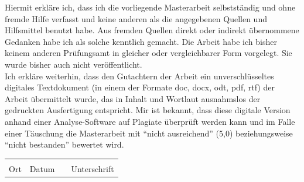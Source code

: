 \documentclass[oneside,12pt]{report}
\begin{document}
Hiermit erkläre ich, dass ich die vorliegende Masterarbeit selbstständig und ohne fremde Hilfe verfasst und keine anderen als die angegebenen Quellen und Hilfsmittel benutzt habe. Aus fremden Quellen direkt oder indirekt übernommene Gedanken habe ich als solche kenntlich gemacht. Die Arbeit habe ich bisher keinem anderen Prüfungsamt in gleicher oder vergleichbarer Form vorgelegt. Sie wurde bisher auch nicht veröffentlicht.\\[2cm]
Ich erkläre weiterhin, dass den Gutachtern der Arbeit ein unverschlüsseltes digitales Textdokument (in einem der Formate doc, docx, odt, pdf, rtf) der Arbeit übermittelt wurde, das in Inhalt und Wortlaut ausnahmslos der gedruckten Ausfertigung entspricht. Mir ist bekannt, dass diese digitale Version anhand einer Analyse-Software auf Plagiate überprüft werden kann und im Falle einer Täuschung die Masterarbeit mit “nicht ausreichend” (5,0) beziehungsweise “nicht bestanden” bewertet wird.\\[2cm]
\begin{tabular}{ p{3cm}p{3cm}p{1cm}p{5cm} }
    \hrulefill & \hrulefill & & \hrulefill\\
    Ort & Datum & & Unterschrift
\end{tabular}

\newpage

\tableofcontents

\newpage
\hypersetup{pageanchor=true}



\clearpage
	
\end{document}
